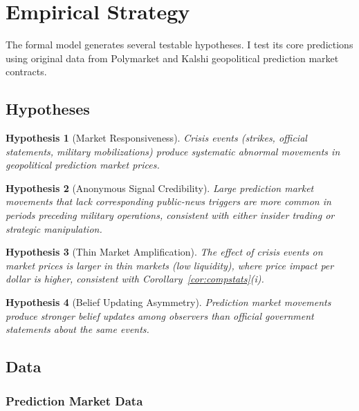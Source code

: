 \documentclass[12pt]{article}
\newtheorem{hypothesis}{Hypothesis}
\begin{document}
\section{Empirical Strategy}\label{sec:empirical}

The formal model generates several testable hypotheses. I test its core predictions using original data from Polymarket and Kalshi geopolitical prediction market contracts.

\subsection{Hypotheses}

\begin{hypothesis}[Market Responsiveness]\label{hyp:responsive}
Crisis events (strikes, official statements, military mobilizations) produce systematic abnormal movements in geopolitical prediction market prices.
\end{hypothesis}

\begin{hypothesis}[Anonymous Signal Credibility]\label{hyp:credibility}
Large prediction market movements that lack corresponding public-news triggers are more common in periods preceding military operations, consistent with either insider trading or strategic manipulation.
\end{hypothesis}

\begin{hypothesis}[Thin Market Amplification]\label{hyp:thin}
The effect of crisis events on market prices is larger in thin markets (low liquidity), where price impact per dollar is higher, consistent with Corollary~\ref{cor:compstats}(i).
\end{hypothesis}

\begin{hypothesis}[Belief Updating Asymmetry]\label{hyp:belief}
Prediction market movements produce stronger belief updates among observers than official government statements about the same events.
\end{hypothesis}

\subsection{Data}

\subsubsection{Prediction Market Data}
\end{document}
